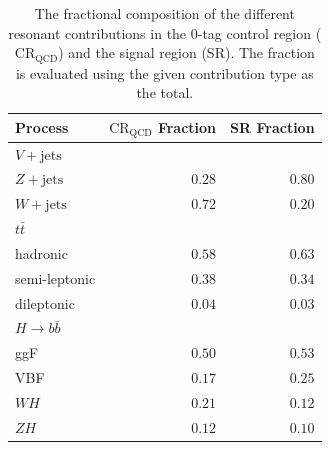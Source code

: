 \begin{table}[htpb]
 \centering
 \caption{The fractional composition of the different resonant contributions in the $0$-tag control region ($\text{CR}_{\text{QCD}}$) and the signal region (SR). The fraction is evaluated using the given contribution type as the total.}
 \begin{tabular}{@{}lrr@{}}
  \toprule
  Process                                   & $\text{CR}_{\text{QCD}}$ Fraction & SR Fraction \\ \midrule
  $V+\text{jets}$                                  &                   &             \\
  \phantom{$V+\text{jets}$\quad} $Z+\text{jets}$ & $0.28$            & $0.80$      \\
  \phantom{$V+\text{jets}$\quad} $W+\text{jets}$ & $0.72$            & $0.20$      \\
  $t\bar{t}$                                &                   &             \\
  \phantom{$t\bar{t}$\quad} hadronic        & $0.58$            & $0.63$      \\
  \phantom{$t\bar{t}$\quad} semi-leptonic   & $0.38$            & $0.34$      \\
  \phantom{$t\bar{t}$\quad} dileptonic      & $0.04$            & $0.03$      \\
  $H \rightarrow b\bar{b}$                                    &                   &             \\
  \phantom{$H \rightarrow b\bar{b}$\quad} ggF                 & $0.50$            & $0.53$      \\
  \phantom{$H \rightarrow b\bar{b}$\quad} VBF                 & $0.17$            & $0.25$      \\
  \phantom{$H \rightarrow b\bar{b}$\quad} $WH$                & $0.21$            & $0.12$      \\
  \phantom{$H \rightarrow b\bar{b}$\quad} $ZH$                & $0.12$            & $0.10$      \\
  \bottomrule
 \end{tabular}
 \label{table:fractional_composition}
\end{table}

